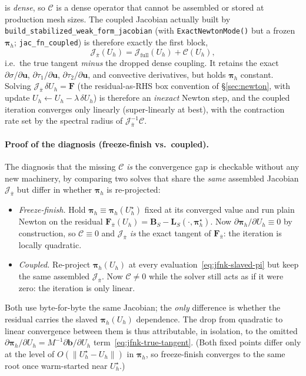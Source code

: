 \documentclass{article}
\newcommand{\code}[1]{\texttt{\small #1}}
\begin{document}
is \emph{dense}, so $\mathcal{C}$ is a dense operator that cannot be
assembled or stored at production mesh sizes. The coupled Jacobian
actually built by \code{build\_stabilized\_weak\_form\_jacobian}
(with \code{ExactNewtonMode()} but a frozen $\boldsymbol{\pi}_h$;
\code{jac\_fn\_coupled}) is therefore exactly the first block,
\begin{equation}
    \label{eq:jfnk-frozen-jac}
    \mathcal{J}_{\bar\pi}(U_h)
        = \mathcal{J}_{\mathrm{full}}(U_h) + \mathcal{C}(U_h),
\end{equation}
i.e.\ the true tangent \emph{minus} the dropped dense coupling. It
retains the exact $\partial\sigma/\partial\boldsymbol{u}$,
$\partial\tau_1/\partial\boldsymbol{u}$,
$\partial\tau_2/\partial\boldsymbol{u}$, and convective derivatives, but
holds $\boldsymbol{\pi}_h$ constant. Solving $\mathcal{J}_{\bar\pi}\,
\delta U_h = \boldsymbol{F}$ (the residual-as-RHS box convention of
§\ref{sec:newton}, with update $U_h \leftarrow U_h - \lambda\,\delta U_h$)
is therefore an \emph{inexact} Newton step, and the coupled iteration
converges only linearly (super-linearly at best), with the contraction
rate set by the spectral radius of $\mathcal{J}_{\bar\pi}^{-1}\mathcal{C}$.

\paragraph{Proof of the diagnosis (freeze-finish vs.\ coupled).}  The
diagnosis that the missing $\mathcal{C}$ \emph{is} the convergence gap
is checkable without any new machinery, by comparing two solves that
share the \emph{same} assembled Jacobian $\mathcal{J}_{\bar\pi}$ but
differ in whether $\boldsymbol{\pi}_h$ is re-projected:
\begin{itemize}
\item \emph{Freeze-finish.}  Hold $\boldsymbol{\pi}_h \equiv
\boldsymbol{\pi}_h(U_h^\star)$ fixed at its converged value and run plain
Newton on the residual $\boldsymbol{F}_{\bar\pi}(U_h) = \boldsymbol{B}_S
- \boldsymbol{L}_S(\cdot,\boldsymbol{\pi}_h^\star)$. Now
$\partial\boldsymbol{\pi}_h/\partial U_h \equiv 0$ by construction, so
$\mathcal{C} \equiv 0$ and $\mathcal{J}_{\bar\pi}$ \emph{is} the exact
tangent of $\boldsymbol{F}_{\bar\pi}$: the iteration is locally
quadratic.
\item \emph{Coupled.}  Re-project $\boldsymbol{\pi}_h(U_h)$ at every
evaluation~\eqref{eq:jfnk-slaved-pi} but keep the same assembled
$\mathcal{J}_{\bar\pi}$. Now $\mathcal{C} \neq 0$ while the solver still
acts as if it were zero: the iteration is only linear.
\end{itemize}
Both use byte-for-byte the same Jacobian; the \emph{only} difference is
whether the residual carries the slaved $\boldsymbol{\pi}_h(U_h)$
dependence. The drop from quadratic to linear convergence between them
is thus attributable, in isolation, to the omitted
$\partial\boldsymbol{\pi}_h/\partial U_h = M^{-1}\partial\boldsymbol{b}/
\partial U_h$ term~\eqref{eq:jfnk-true-tangent}. (Both fixed points
differ only at the level of $O(\|U_h^\star - U_h\|)$ in
$\boldsymbol{\pi}_h$, so freeze-finish converges to the same root once
warm-started near $U_h^\star$.)
\end{document}
